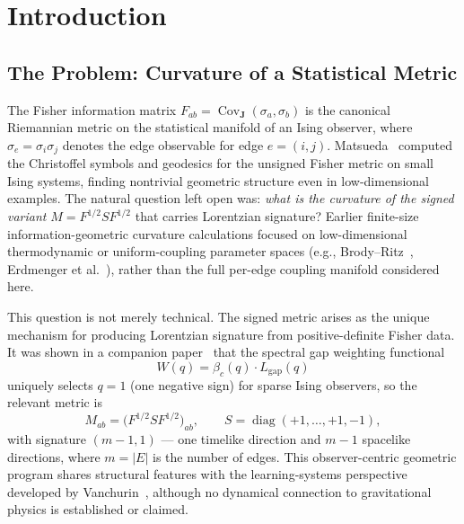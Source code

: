 \documentclass[11pt]{article}
\theoremstyle{definition}
\theoremstyle{remark}
\newcommand{\Fish}{F}
\newcommand{\sgn}{S}
\newcommand{\Met}{M}
\newcommand{\coupl}{\mathbf{J}}
\newcommand{\Cov}{\operatorname{Cov}}
\newcommand{\diag}{\operatorname{diag}}
\newcommand{\edgeo}{\sigma}
\begin{document}
\tableofcontents

\section{Introduction}
\label{sec:intro}

\subsection{The Problem: Curvature of a Statistical Metric}

The Fisher information matrix $\Fish_{ab} = \Cov_{\coupl}(\edgeo_a, \edgeo_b)$
is the canonical Riemannian metric on the statistical manifold of an Ising
observer, where $\edgeo_e = \sigma_i \sigma_j$ denotes the edge observable
for edge $e = (i,j)$. Matsueda~\cite{Matsueda2013} computed the Christoffel
symbols and geodesics for the unsigned Fisher metric on small Ising
systems, finding nontrivial geometric structure even in low-dimensional
examples. The natural question left open was: \emph{what is the curvature
of the signed variant} $\Met = \Fish^{1/2} \sgn \Fish^{1/2}$ that carries
Lorentzian signature?
Earlier finite-size information-geometric curvature calculations
focused on low-dimensional thermodynamic or uniform-coupling parameter spaces
(e.g., Brody--Ritz~\cite{BrodyRitz2003}, Erdmenger et al.~\cite{Erdmenger2020}),
rather than the full per-edge coupling manifold considered here.

This question is not merely technical. The signed metric arises as the
unique mechanism for producing Lorentzian signature from positive-definite
Fisher data. It was shown in a companion paper~\cite{Paper5} that the spectral
gap weighting functional
\begin{equation}
  W(q) = \beta_c(q) \cdot L_{\mathrm{gap}}(q)
  \label{eq:W-def}
\end{equation}
uniquely selects $q = 1$ (one negative sign) for sparse Ising observers,
so the relevant metric is
\begin{equation}
  \Met_{ab} = \bigl(\Fish^{1/2} \sgn \Fish^{1/2}\bigr)_{ab},
  \qquad \sgn = \diag(+1, \ldots, +1, -1),
  \label{eq:signed-metric}
\end{equation}
with signature $(m{-}1, 1)$ --- one timelike direction and $m{-}1$
spacelike directions, where $m = |E|$ is the number of edges.
This observer-centric geometric program shares structural features with the
learning-systems perspective developed by
Vanchurin~\cite{Vanchurin2022}, although no dynamical connection to
gravitational physics is established or claimed.
\end{document}
